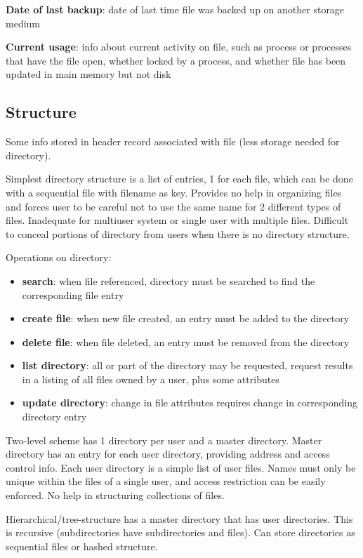 \documentclass[11pt]{article}
\begin{document}
\textbf{Date of last backup}: date of last time file was backed up on another storage medium

\textbf{Current usage}: info about current activity on file, such as process or processes that have the
file open, whether locked by a process, and whether file has been updated in main memory but not disk
\subsection{Structure}
\label{sec:orgc5c18b7}
Some info stored in header record associated with file (less storage needed for directory).

Simplest directory structure is a list of entries, 1 for each file, which can be done with a
sequential file with filename as key.
Provides no help in organizing files and forces user to be careful not to use the same name for 2
different types of files.
Inadequate for multiuser system or single user with multiple files.
Difficult to conceal portions of directory from users when there is no directory structure.

Operations on directory:
\begin{itemize}
\item \textbf{search}: when file referenced, directory must be searched to find the corresponding file entry
\item \textbf{create file}: when new file created, an entry must be added to the directory
\item \textbf{delete file}: when file deleted, an entry must be removed from the directory
\item \textbf{list directory}: all or part of the directory may be requested, request results in a listing of
all files owned by a user, plus some attributes
\item \textbf{update directory}: change in file attributes requires change in corresponding directory entry
\end{itemize}

Two-level scheme has 1 directory per user and a master directory.
Master directory has an entry for each user directory, providing address and access control info.
Each user directory is a simple list of user files.
Names must only be unique within the files of a single user, and access restriction can be easily
enforced.
No help in structuring collections of files.

Hierarchical/tree-structure has a master directory that has user directories.
This is recursive (subdirectories have subdirectories and files).
Can store directories as sequential files or hashed structure.
\end{document}
